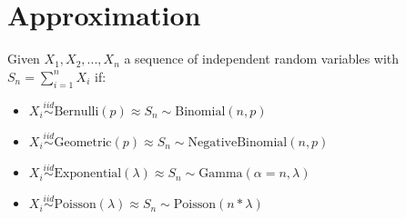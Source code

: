 \chapter{Approximation}
Given \(X_1,X_2,...,X_n\) a sequence of independent random variables with \(S_n = \sum_{i = 1}^n X_i\) if:
\begin{itemize}
    \item \(X_i \stackrel{iid}{\sim} \text{Bernulli}(p) \approx S_n \sim \text{Binomial}(n,p)\)
    \item \(X_i \stackrel{iid}{\sim} \text{Geometric}(p) \approx S_n \sim \text{NegativeBinomial}(n,p)\)
    \item \(X_i \stackrel{iid}{\sim} \text{Exponential}(\lambda) \approx S_n \sim \text{Gamma}(\alpha=n,\lambda)\)
    \item \(X_i \stackrel{iid}{\sim} \text{Poisson}(\lambda) \approx S_n \sim \text{Poisson}(n*\lambda)\)
\end{itemize}